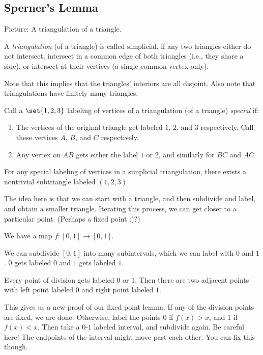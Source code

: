 \documentclass{article}
\theoremstyle{remark}
\begin{document}
\subsection{Sperner's Lemma}

Picture: A triangulation of a triangle.

\begin{definition}
    A \emph{triangulation} (of a triangle)
    is called simplicial, if any 
    two triangles either do not intersect, intersect in a
    common edge of both triangles (i.e., they share a side),
    or intersect at their vertices (a single common vertex only).

    Note that this implies that the triangles' interiors are all
    disjoint. Also note that triangulations have finitely
    many triangles.
\end{definition}

Call a $\set{1,2,3}$ labeling of vertices of a triangulation
(of a triangle)
\emph{special} if: 
\begin{enumerate}
    \item The vertices of the original triangle get 
        labeled $1$, $2$, and $3$ respectively. Call these vertices
        $A$, $B$, and $C$ respectively. 
    \item Any vertex on $AB$ gets either
        the label $1$ or $2$, and similarly for $BC$ and $AC$.
\end{enumerate}

\begin{theorem}
    For any special labeling of vertices in a simplicial
    triangulation, there exists a nontrivial subtriangle
    labeled $(1,2,3)$
\end{theorem}

The idea here is that we can start with a triangle, and 
then subdivide and label, and obtain a smaller triangle.
Iterating this process, we can get closer to a particular point.
(Perhaps a fixed point :)?) 

We have a map $f:[0,1]\to [0,1]$. 

We can subdivide $[0,1]$ into many subintervals, which we can 
label with $0$ and $1$. $0$ gets labeled $0$ and $1$ gets 
labeled $1$.

Every point of division gets labeled $0$ or $1$.
Then there are two adjacent points with left point labeled $0$
and right point labeled $1$.

This gives us a new proof of our fixed point lemma.
If any of the division points are fixed, we are done.
Otherwise, label the points $0$ if $f(x) > x$, and $1$ if 
$f(x)<x$. Then take a $0$-$1$ labeled interval, and subdivide
again. Be careful here! The endpoints of the interval might 
move past each other. You can fix this though.
\end{document}
